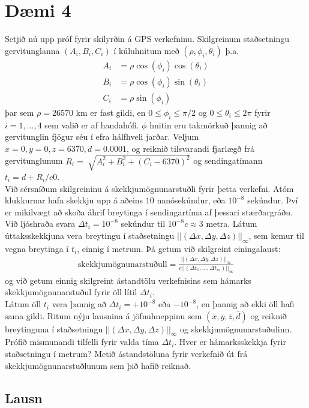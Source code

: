 \documentclass[11pt]{article}
\begin{document}
\newpage

\section*{Dæmi 4}
Setjið nú upp próf fyrir skilyrðin á GPS verkefninu. Skilgreinum staðsetningu gervitunglanna $(A_i, B_i, C_i)$ í kúluhnitum með $(\rho, \phi_i, \theta_i)$ þ.a.
\begin{align*}
A_i&=\rho\cos(\phi_i)\cos(\theta_i)\\
B_i&=\rho\cos(\phi_i)\sin(\theta_i)\\
C_i&=\rho\sin(\phi_i)
\end{align*}
þar sem $\rho = 26570$ km er fast gildi, en $0\leq\phi_i\leq\pi/2$ og $0\leq\theta_i\leq2\pi$ fyrir $i=1,...,4$ sem valið er af handahófi. $\phi$ hnitin eru takmörkuð þannig að gervitunglin fjögur séu í efra hálfhveli jarðar. Veljum $x=0, y=0, z=6370, d=0.0001$, og reiknið tilsvarandi fjarlægð frá gervitunglunum $R_i=\sqrt[]{A_i^2 +B_i^2 + (C_i-6370)^2}$ og sendingatímann $t_i=d+R_i/c0$.\\
	Við sérsníðum skilgreininu á skekkjumögnunarstuðli fyrir þetta verkefni. Atóm klukkurnar hafa skekkju upp á aðeins $10$ nanósekúndur, eða $10^{-8}$ sekúndur. Því er mikilvægt að skoða áhrif breytinga í sendingartíma af þessari stærðargráðu. Við ljóshraða svara $\Delta t_i=10^{-8}$ sekúndur til $10^{-8}c\approx3$ metra. Látum úttaksskekkjuna vera breytingu í staðsetningu $||(\Delta x, \Delta y, \Delta z)||_\infty$, sem kemur til vegna breytinga í $t_i$, einnig í metrum. Þá getum við skilgreint einingalaust:
\begin{align*}
\text{skekkjumögnunarstuðull} = \frac{||(\Delta x, \Delta y, \Delta z)||_\infty}{c||(\Delta t_1,...,\Delta t_m)||_\infty}
\end{align*}
og við getum einnig skilgreint ástandtölu verkefnisins sem hámarks skekkjumögnunarstuðul fyrir öll lítil $\Delta t_i$.\\
	Látum öll $t_i$ vera þannig að $\Delta t_i = +10^{-8}$ eða $-10^{-8}$, en þannig að ekki öll hafi sama gildi. Ritum nýju lausnina á jöfnuhneppinu sem $(\overline{x},\overline{y},\overline{z},\overline{d})$ og reiknið breytinguna í staðsetningu $||(\Delta x, \Delta y, \Delta z)||_\infty$ og skekkjumögnunarstuðulinn. Prófið mismunandi tilfelli fyrir valda tíma $\Delta t_i$. Hver er hámarksskekkja fyrir staðsetningu í metrum? Metið ástandstöluna fyrir verkefnið út frá skekkjumögnunarstuðlunum sem þið hafið reiknað. 

\subsection*{Lausn}
\end{document}

